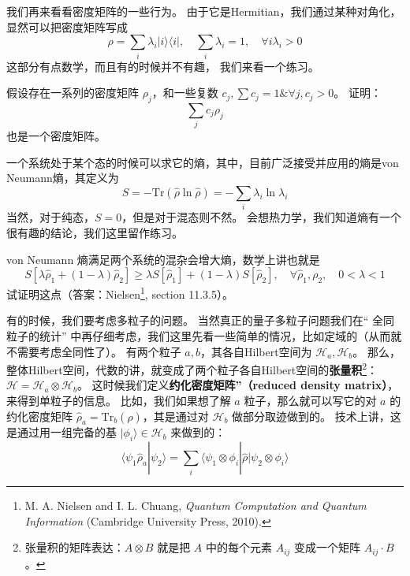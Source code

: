 我们再来看看密度矩阵的一些行为。 由于它是Hermitian，我们通过某种对角化，显然可以把密度矩阵写成
\begin{equation}
\rho = \sum_i\lambda_i|i\rangle\langle i|,\quad \sum_i\lambda_i = 1,\quad \forall i\lambda_i > 0 
\end{equation}
这部分有点数学，而且有的时候并不有趣， 我们来看一个练习。

\begin{exercise}{}
假设存在一系列的密度矩阵 $\rho_j$，和一些复数 $c_j, \sum c_j = 1 \& \forall j, c_j>0$。 证明：
\begin{equation}
\sum_j c_j \rho_j 
\end{equation}
也是一个密度矩阵。
\end{exercise}

一个系统处于某个态的时候可以求它的熵，其中，目前广泛接受并应用的熵是von Neumann熵，其定义为
\begin{equation}
S=-\text{Tr}(\hat\rho\ln\hat\rho)=-\sum_i\lambda_i\ln\lambda_i
\end{equation}
当然，对于纯态，$S=0$，但是对于混态则不然。 会想热力学，我们知道熵有一个很有趣的结论，我们这里留作练习。

\begin{exercise}{}
von Neumann 熵满足两个系统的混杂会增大熵，数学上讲也就是
\begin{equation}
S[\lambda\hat\rho_1+(1-\lambda)\hat\rho_2]\ge\lambda S[\hat\rho_1]+(1-\lambda) S[\hat\rho_2],\quad \forall \hat\rho_1,\rho_2,\quad 0<\lambda<1
\end{equation}
试证明这点（答案：Nielsen\footnote{M. A. Nielsen and I. L. Chuang, \textsl{Quantum Computation and Quantum Information} (Cambridge University Press, 2010).}, section 11.3.5）。
\end{exercise}

有的时候，我们要考虑多粒子的问题。 当然真正的量子多粒子问题我们在“ 全同粒子的统计” 中再仔细考虑，我们这里先看一些简单的情况，比如定域的（从而就不需要考虑全同性了）。 有两个粒子 $a, b$，其各自Hilbert空间为 $\mathcal{H}_a, \mathcal{H}_b$。 那么，整体Hilbert空间，代数的讲，就变成了两个粒子各自Hilbert空间的\textbf{张量积}\footnote{张量积的矩阵表达：$A\otimes B$ 就是把 $A$ 中的每个元素 $A_{ij}$ 变成一个矩阵 $A_{ij}\cdot B$。}：$\mathcal{H} = \mathcal{H}_a\otimes \mathcal{H}_b$。 这时候我们定义\textbf{约化密度矩阵”（reduced density matrix）}，来得到单粒子的信息。 比如，我们如果想了解 $a$ 粒子，那么就可以写它的对 $a$ 的约化密度矩阵 $\hat\rho_a=\text{Tr}_b(\hat\rho)$，其是通过对 $\mathcal{H}_b$ 做部分取迹做到的。 技术上讲，这是通过用一组完备的基 $|\phi_i\rangle \in\mathcal{H}_b$ 来做到的：
\begin{equation}
\langle\psi_1\hat\rho_a|\psi_2\rangle=\sum_i\langle\psi_1\otimes\phi_i|\hat\rho|\psi_2\otimes\phi_i\rangle
\end{equation}

